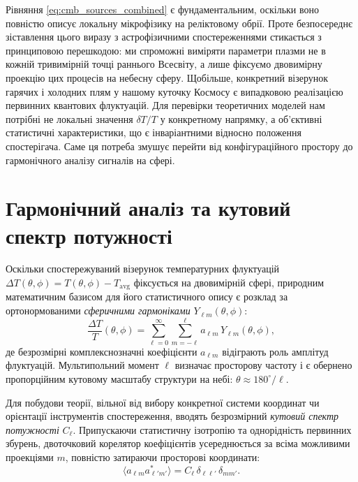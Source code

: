 Рівняння \eqref{eq:cmb_sources_combined} є фундаментальним, оскільки воно повністю описує локальну мікрофізику на реліктовому обрії. Проте безпосереднє зіставлення цього виразу з астрофізичними спостереженнями стикається з принциповою перешкодою: ми спроможні виміряти параметри плазми не в кожній тривимірній точці раннього Всесвіту, а лише фіксуємо двовимірну проекцію цих процесів на небесну сферу. Щобільше, конкретний візерунок гарячих і холодних плям у нашому куточку Космосу є випадковою реалізацією первинних квантових флуктуацій. Для перевірки теоретичних моделей нам потрібні не локальні значення $\delta T / T$ у конкретному напрямку, а об'єктивні статистичні характеристики, що є інваріантними відносно положення спостерігача. Саме ця потреба змушує перейти від конфігураційного простору до гармонічного аналізу сигналів на сфері.

\section{Гармонічний аналіз та кутовий спектр потужності}
\label{subsec:harmonic_analysis}

Оскільки спостережуваний візерунок температурних флуктуацій $\Delta T(\theta,\phi) = T(\theta,\phi) - T_\text{avg} $ фіксується на двовимірній сфері, природним математичним базисом для його статистичного опису є розклад за ортонормованими \emph{сферичними гармоніками} $Y_{\ell m}(\theta,\phi)$:
\begin{equation}\label{eq:spherical_decomp_integrated}
    \frac{\Delta T}{T}(\theta,\phi) = \sum_{\ell=0}^{\infty}\sum_{m=-\ell}^{\ell} a_{\ell m}\,Y_{\ell m}(\theta,\phi),
\end{equation}
де безрозмірні комплекснозначні коефіцієнти $a_{\ell m}$ відіграють роль амплітуд флуктуацій. Мультипольний момент $\ell$ визначає просторову частоту і є обернено пропорційним кутовому масштабу структури на небі: $\theta \approx 180^\circ/\ell$.

Для побудови теорії, вільної від вибору конкретної системи координат чи орієнтації інструментів спостереження, вводять безрозмірний \emph{кутовий спектр потужності} $C_\ell$. Припускаючи статистичну ізотропію та однорідність первинних збурень, двоточковий корелятор коефіцієнтів усереднюється за всіма можливими проекціями $m$, повністю затираючи просторові координати:
\begin{equation}
    \langle a_{\ell m} a_{\ell' m'}^* \rangle = C_\ell \, \delta_{\ell \ell'} \, \delta_{m m'}.
\end{equation}

